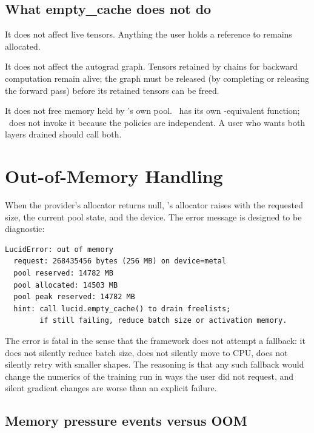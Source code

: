 \subsection{What empty\_cache does not do}
\label{ssec:allocator:not_empty_cache}

It does not affect live tensors. Anything the user holds a
reference to remains allocated.

It does not affect the autograd graph. Tensors retained by
 chains for backward computation remain alive; the
graph must be released (by completing or releasing the forward
pass) before its retained tensors can be freed.

It does not free memory held by \MLX's own pool. \MLX\ has its own
-equivalent function; \Lucid\ does not
invoke it because the policies are independent. A user who wants
both layers drained should call both.

\section{Out-of-Memory Handling}
\label{sec:allocator:oom}

When the provider's allocator returns null, \Lucid's allocator
raises  with the requested size,
the current pool state, and the device. The error message is
designed to be diagnostic:

\begin{verbatim}
LucidError: out of memory
  request: 268435456 bytes (256 MB) on device=metal
  pool reserved: 14782 MB
  pool allocated: 14503 MB
  pool peak reserved: 14782 MB
  hint: call lucid.empty_cache() to drain freelists;
        if still failing, reduce batch size or activation memory.
\end{verbatim}

The error is fatal in the sense that the framework does not
attempt a fallback: it does not silently reduce batch size, does
not silently move to CPU, does not silently retry with smaller
shapes. The reasoning is that any such fallback would change the
numerics of the training run in ways the user did not request, and
silent gradient changes are worse than an explicit failure.

\subsection{Memory pressure events versus OOM}
\label{ssec:allocator:pressure_oom}

